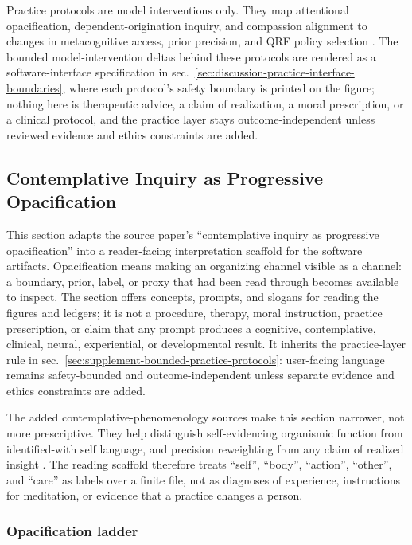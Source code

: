 \documentclass[
]{article}
\begin{document}
Practice protocols are model interventions only. They map attentional
opacification, dependent-origination inquiry, and compassion alignment
to changes in metacognitive access, prior precision, and QRF policy
selection \citep{sandvedsmith2024metacognitive, lutz2008attention}. The
bounded model-intervention deltas behind these protocols are rendered as
a software-interface specification in
sec.~\ref{sec:discussion-practice-interface-boundaries}, where each
protocol's safety boundary is printed on the figure; nothing here is
therapeutic advice, a claim of realization, a moral prescription, or a
clinical protocol, and the practice layer stays outcome-independent
unless reviewed evidence and ethics constraints are added.

\subsection{Contemplative Inquiry as Progressive
Opacification}\label{sec:supplement-contemplative-inquiry}

This section adapts the source paper's ``contemplative inquiry as
progressive opacification'' into a reader-facing interpretation scaffold
for the software artifacts. Opacification means making an organizing
channel visible as a channel: a boundary, prior, label, or proxy that
had been read through becomes available to inspect. The section offers
concepts, prompts, and slogans for reading the figures and ledgers; it
is not a procedure, therapy, moral instruction, practice prescription,
or claim that any prompt produces a cognitive, contemplative, clinical,
neural, experiential, or developmental result. It inherits the
practice-layer rule in
sec.~\ref{sec:supplement-bounded-practice-protocols}: user-facing
language remains safety-bounded and outcome-independent unless separate
evidence and ethics constraints are added.

The added contemplative-phenomenology sources make this section
narrower, not more prescriptive. They help distinguish self-evidencing
organismic function from identified-with self language, and precision
reweighting from any claim of realized insight
\citep{hohwy2026selfevidencingagent, tal2026advancedmeditation, prest2026lettinggo, prest2026selfingwithoutself}.
The reading scaffold therefore treats ``self'', ``body'', ``action'',
``other'', and ``care'' as labels over a finite file, not as diagnoses
of experience, instructions for meditation, or evidence that a practice
changes a person.

\subsubsection{Opacification ladder}\label{opacification-ladder}
\end{document}

